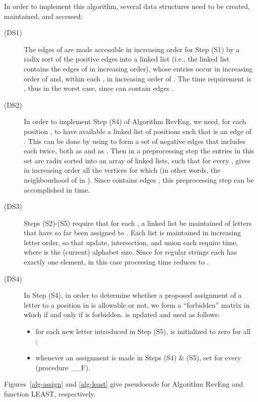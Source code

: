 \documentclass[runningheads,a4paper]{llncs}
\def\s#1{\mbox{\boldmath }}
\def\UPDATE\_F{\tt{UPDATE\_F}}
\begin{document}
In order to implement this algorithm, several data structures need
to be created, maintained, and accessed:


\begin{description}
\item[(DS1)]
The edges of  are made accessible in increasing order for Step (S1) by
a radix sort of the positive edges  into a linked list  (i.e., the linked list  contains the edges of  in increasing order),
whose entries occur in increasing order of  and, within each ,
in increasing order of .
The time requirement is , thus  in the worst case,
since  can contain  edges \cite{CRSW13}.
\item[(DS2)]
In order to implement Step (S4) of Algorithm RevEng, we need,
for each position , to have available a linked list of positions
 such that  is an edge of .
This can be done by using  to form a set of negative edges that includes
each  twice, both as  and as .
Then in a preprocessing step the entries in this set are radix sorted
into an array  of  linked lists, such that for every ,
 gives in increasing order all the vertices 
for which 
(in other words, the neighbourhood of  in ).
Since  contains  edges \cite{CRSW13},
this preprocessing step can be accomplished in  time.
\item[(DS3)]
Steps (S2)-(S5) require that for each ,
a linked list  be maintained of letters 
that have so far been assigned to .
Each list is maintained in increasing letter order,
so that update, intersection, and union each require  time,
where  is the (current) alphabet size.
Since for regular strings each  has exactly one element,
in this case processing time reduces to .
\item[(DS4)]
In Step (S4), in order to determine whether a proposed assignment
of a letter  to a position  in \s{x} is allowable or not,
we form a ``forbidden'' matrix  in which
 if and only if  is forbidden.
 is updated and used as follows:
\begin{itemize}
\item
for each new letter  introduced in Step (S5),
 is initialized to zero for all ;
\item
whenever an assignment 
is made in Steps (S4) \& (S5), set
 for every 
(procedure \UPDATE\_F).
\end{itemize}
\end{description}
Figures~\ref{alg-assign} and \ref{alg-least} give pseudocode
for Algorithm RevEng and function LEAST, respectively.
\end{document}
